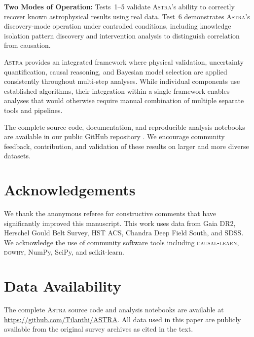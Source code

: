 \documentclass[fleqn,usenatbib]{mnras}
\newcommand{\astra}{\textsc{Astra}\xspace}
\begin{document}
\textbf{Two Modes of Operation:}
Tests~1--5 validate \astra's ability to correctly recover known astrophysical results using real data.
Test~6 demonstrates \astra's discovery-mode operation under controlled conditions, including knowledge isolation pattern discovery and intervention analysis to distinguish correlation from causation.

\astra provides an integrated framework where physical validation, uncertainty quantification, causal reasoning, and Bayesian model selection are applied consistently throughout multi-step analyses.
While individual components use established algorithms, their integration within a single framework enables analyses that would otherwise require manual combination of multiple separate tools and pipelines.

The complete source code, documentation, and reproducible analysis notebooks are available in our public GitHub repository \citep{WhiteDey2026}.
We encourage community feedback, contribution, and validation of these results on larger and more diverse datasets.

\section*{Acknowledgements}

We thank the anonymous referee for constructive comments that have significantly improved this manuscript.
This work uses data from Gaia DR2, Herschel Gould Belt Survey, HST ACS, Chandra Deep Field South, and SDSS.
We acknowledge the use of community software tools including \textsc{causal-learn}, \textsc{dowhy}, NumPy, SciPy, and scikit-learn.

\section*{Data Availability}

The complete \astra source code and analysis notebooks are available at \url{https://github.com/Tilanthi/ASTRA}.
All data used in this paper are publicly available from the original survey archives as cited in the text.



\end{document}
